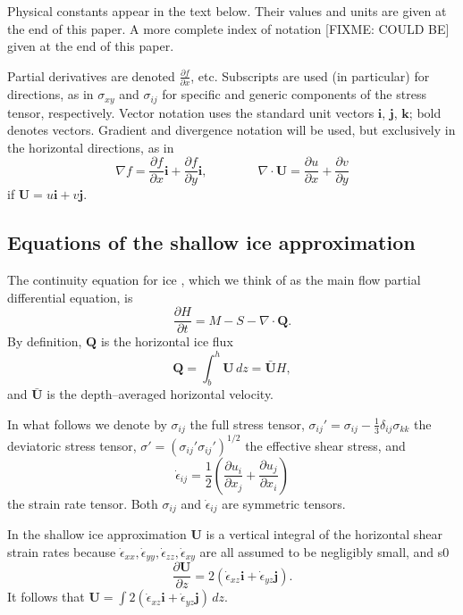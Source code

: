 \documentclass[12pt,final]{amsart}%
\theoremstyle{plain}
\theoremstyle{definition}
\theoremstyle{remark}
\newcommand{\dd}[2]{\ensuremath{\frac{\partial #1}{\partial #2}}}
\newcommand{\ddt}[1]{\ensuremath{\frac{\partial #1}{\partial t}}}
\newcommand{\ddx}[1]{\ensuremath{\frac{\partial #1}{\partial x}}}
\newcommand{\ddy}[1]{\ensuremath{\frac{\partial #1}{\partial y}}}
\newcommand{\ddz}[1]{\ensuremath{\frac{\partial #1}{\partial z}}}
\newcommand{\diverg}{\nabla\cdot}
\def\eps{\epsilon}
\newcommand{\grad}{\nabla}
\newcommand{\ihat}{\mathbf{i}}
\newcommand{\jhat}{\mathbf{j}}
\newcommand{\khat}{\mathbf{k}}
\newcommand{\bQ}{{\mathbf{Q}}}
\newcommand{\bU}{{\mathbf{U}}}
\begin{document}
Physical constants appear in the text below.  Their values and units are given at the end of this paper.  A more complete index of notation [FIXME: COULD BE] given at the end of this paper.

Partial derivatives are denoted $\frac{\partial f}{\partial x}$, etc.  Subscripts are used (in particular) for directions, as in $\sigma_{xy}$ and $\sigma_{ij}$ for specific and generic components of the stress tensor, respectively.  Vector notation uses the standard unit vectors $\ihat$, $\jhat$, $\khat$; bold denotes vectors.  Gradient and divergence notation will be used, but exclusively in the horizontal directions, as in
    $$\grad f = \ddx{f} \ihat + \ddy{f} \ihat, \qquad \qquad \diverg \bU = \ddx{u} + \ddy{v}$$
if $\bU=u\ihat+v\jhat$.


\subsection*{Equations of the shallow ice approximation}  The continuity equation for ice \citep{Paterson}, which we think of as the main flow partial differential equation, is
\begin{equation}\label{Cfirst}
\ddt{H} = M - S - \diverg \bQ.
\end{equation}
By definition, $\bQ$ is the horizontal ice flux
\begin{equation}\label{flux}
\bQ = \int_{b}^h \bU\,dz = \bar \bU H,
\end{equation}
and $\bar \bU$ is the depth--averaged horizontal velocity.

In what follows we denote by $\sigma_{ij}$ the full stress tensor, $\sigma_{ij}'= \sigma_{ij}- \frac{1}{3} \delta_{ij} \sigma_{kk}$ the deviatoric stress tensor, $\sigma'= \left(\sigma_{ij}' \sigma_{ij}'\right)^{1/2}$  the effective shear stress, and
    $$\dot \eps_{ij} = \frac{1}{2} \left(\dd{u_i}{x_j} + \dd{u_j}{x_i}\right)$$
the strain rate tensor.  Both $\sigma_{ij}$ and $\dot \eps_{ij}$ are symmetric tensors.

In the shallow ice approximation \citep{Fowler} $\bU$ is a vertical integral of the horizontal shear strain rates because $\dot \eps_{xx},\dot \eps_{yy},\dot \eps_{zz},\dot \eps_{xy}$ are all assumed to be negligibly small, and s0
\begin{equation}\label{stressstrain}
\ddz{\bU} = 2(\dot\eps_{xz}\ihat+\dot\eps_{yz}\jhat).
\end{equation}
It follows that $\bU=\int 2(\dot\eps_{xz}\ihat+\dot\eps_{yz}\jhat)\, dz$.
\end{document}
